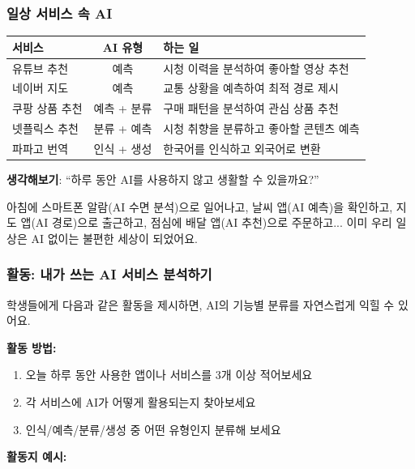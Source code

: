 \documentclass[11pt,a4paper]{article}
\begin{document}
\subsubsection{일상 서비스 속 AI}

\begin{center}
\begin{tabular}{|p{2.5cm}|c|p{7.5cm}|}
\hline
\rowcolor{tableheader}
\textbf{서비스} & \textbf{AI 유형} & \textbf{하는 일} \\
\hline
유튜브 추천 & 예측 & 시청 이력을 분석하여 좋아할 영상 추천 \\
\hline
네이버 지도 & 예측 & 교통 상황을 예측하여 최적 경로 제시 \\
\hline
쿠팡 상품 추천 & 예측 + 분류 & 구매 패턴을 분석하여 관심 상품 추천 \\
\hline
넷플릭스 추천 & 분류 + 예측 & 시청 취향을 분류하고 좋아할 콘텐츠 예측 \\
\hline
파파고 번역 & 인식 + 생성 & 한국어를 인식하고 외국어로 변환 \\
\hline
\end{tabular}
\end{center}

\begin{questionbox}
 \textbf{생각해보기}: ``하루 동안 AI를 사용하지 않고 생활할 수 있을까요?''

아침에 스마트폰 알람(AI 수면 분석)으로 일어나고, 날씨 앱(AI 예측)을 확인하고, 지도 앱(AI 경로)으로 출근하고, 점심에 배달 앱(AI 추천)으로 주문하고... 이미 우리 일상은 AI 없이는 불편한 세상이 되었어요.
\end{questionbox}

\subsubsection{활동: 내가 쓰는 AI 서비스 분석하기}

학생들에게 다음과 같은 활동을 제시하면, AI의 기능별 분류를 자연스럽게 익힐 수 있어요.

\textbf{활동 방법:}
\begin{enumerate}[leftmargin=*]
    \item 오늘 하루 동안 사용한 앱이나 서비스를 3개 이상 적어보세요
    \item 각 서비스에 AI가 어떻게 활용되는지 찾아보세요
    \item 인식/예측/분류/생성 중 어떤 유형인지 분류해 보세요
\end{enumerate}

\textbf{활동지 예시:}
\end{document}

